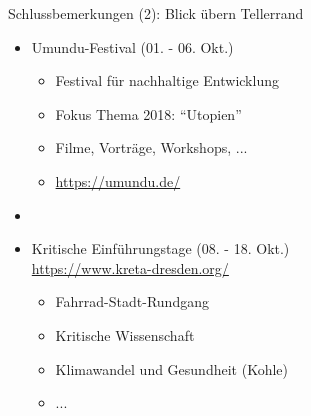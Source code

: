 \documentclass{beamer}
\begin{document}
\begin{frame}[label=schluss20]{Schlussbemerkungen (2): Blick übern Tellerrand}

\begin{itemize}
\vspace{-3mm}
   \item Umundu-Festival (01. - 06. Okt.) \quad \hspace{12mm}
   \begin{itemize}
    \item Festival für nachhaltige Entwicklung
    \item Fokus Thema 2018: "`Utopien"'
    \item Filme, Vorträge, Workshops, ...
    \item \url{https://umundu.de/}
   \end{itemize}
  \item[]

  \pause
 \item Kritische Einführungstage (08. - 18. Okt.)\\[-6mm]
\vspace{-8mm}
\url{https://www.kreta-dresden.org/}
\hspace{12mm}

   \begin{itemize}
    \item Fahrrad-Stadt-Rundgang
    \item Kritische Wissenschaft
    \item Klimawandel und Gesundheit (Kohle)
    \item ...
   \end{itemize}
\end{itemize}

\end{frame}
\end{document}
